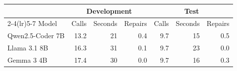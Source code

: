 \begin{tabular}{lrrrrrr}
\toprule
 & \multicolumn{3}{c}{Development} & \multicolumn{3}{c}{Test} \\
\cmidrule(lr){2-4}\cmidrule(lr){5-7}
Model & Calls & Seconds & Repairs & Calls & Seconds & Repairs \\
\midrule
Qwen2.5-Coder 7B & 13.2 & 21 & 0.4 & 9.7 & 15 & 0.5 \\
Llama 3.1 8B & 16.3 & 31 & 0.1 & 9.7 & 23 & 0.0 \\
Gemma 3 4B & 17.4 & 30 & 0.0 & 9.7 & 16 & 0.3 \\
\bottomrule
\end{tabular}
